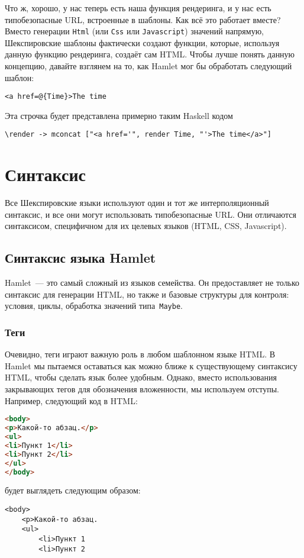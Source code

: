 Что ж, хорошо, у нас теперь есть наша функция рендеринга, и у нас есть
типобезопасные URL, встроенные в шаблоны. Как всё это работает вместе?  Вместо
генерации \lstinline'Html' (или \lstinline'Css' или \lstinline'Javascript')
значений напрямую, Шекспировские шаблоны фактически создают функции, которые,
используя данную функцию рендеринга, создаёт сам HTML. Чтобы лучше понять
данную концепцию, давайте взглянем на то, как Hamlet мог бы обработать
следующий шаблон:

\begin{lstlisting}
<a href=@{Time}>The time
\end{lstlisting}

Эта строчка будет представлена примерно таким Haskell кодом

\begin{lstlisting}
\render -> mconcat ["<a href='", render Time, "'>The time</a>"]
\end{lstlisting}

\section{Синтаксис}

Все Шекспировские языки используют один и тот же интерполяционный синтаксис, и
все они могут использовать типобезопасные URL. Они отличаются синтаксисом,
специфичном для их целевых языков (HTML, CSS, Javascript).

\subsection{Синтаксис языка Hamlet}
Hamlet~--- это самый сложный из языков семейства. Он предоставляет не только
синтаксис для генерации HTML, но также и базовые структуры для контроля:
условия, циклы, обработка значений типа~\lstinline'Maybe'.

\subsubsection{Теги}

Очевидно, теги играют важную роль в любом шаблонном языке HTML. В
Hamlet мы пытаемся оставаться как можно ближе к существующему синтаксису
HTML, чтобы сделать язык более удобным. Однако, вместо использования
закрывающих тегов для обозначения вложенности, мы используем отступы. Например,
следующий код в HTML:
\begin{lstlisting}[language=HTML]
<body>
<p>Какой-то абзац.</p>
<ul>
<li>Пункт 1</li>
<li>Пункт 2</li>
</ul>
</body>
\end{lstlisting}
будет выглядеть следующим образом:
\begin{lstlisting}
<body>
    <p>Какой-то абзац.
    <ul>
        <li>Пункт 1
        <li>Пункт 2
\end{lstlisting}

